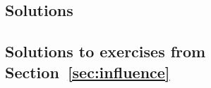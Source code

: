 \documentclass[11pt]{article}
\begin{document}
\begin{pdfonly}
\begin{solutionsonly}
\clearpage
\appendix
\section{Solutions}\label{app:solutions}
\end{solutionsonly}
\end{pdfonly}



\begin{pdfonly}\begin{solutionsonly}
\subsection{Solutions to exercises from Section~\ref{sec:influence}}
\end{solutionsonly}\end{pdfonly}
\end{document}
